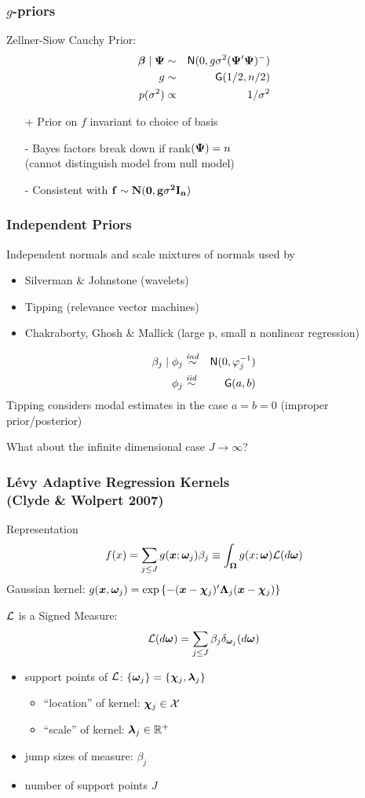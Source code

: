 \documentclass[dvips]{beamer}
\newcommand{\bs}[2]{\begin{frame} \frametitle{#1} 
{#2}
\end{frame} }
\begin{document}
\bs{$g$-priors} {
Zellner-Siow Cauchy Prior:
\begin{eqnarray*}
\bm \beta \mid \bm \Psi & \sim & \textsf{N}(0, g \sigma^2 (\bm \Psi'\bm \Psi)^{-}) \\
 g & \sim & \mbox{\sf G}(1/2, n/2) \\
 p(\sigma^2) & \propto & 1/\sigma^2
\end{eqnarray*}

\begin{itemize}
\item[+] Prior on $f$ invariant to choice of basis
\item[-] Bayes factors break down if rank$(\bm \Psi) = n$ \\ (cannot
  distinguish model from null model)  
\item[-] Consistent with $\bf{f}  \sim  N(0, g \sigma^2 \bm I_n)$
\end{itemize}
}

\bs{Independent Priors} {
Independent normals and scale mixtures of normals used by
\begin{itemize}
\item Silverman \& Johnstone (wavelets)
\item Tipping (relevance vector machines)
\item Chakraborty, Ghosh \& Mallick (large p, small n nonlinear regression)
\end{itemize}
\begin{eqnarray*}
  \beta_j \mid \phi_j & \mathrel{\mathop{\sim}\limits^{\mathit{ind}}} & \textsf{N}(0,  \varphi_j^{-1}) \\
  \phi_j    & \mathrel{\mathop{\sim}\limits^{\mathit{iid}}} & \mbox{\sf G}(a, b) \\
\end{eqnarray*}
Tipping considers modal estimates in the case $a = b = 0$ (improper
prior/posterior)  

\vspace{.25in}
What about the infinite dimensional case $J \rightarrow \infty$?
}


\bs{L\'evy Adaptive Regression Kernels \\ (Clyde \& Wolpert 2007)} {
Representation
$$
f(x)   =   \sum_{j\le J}g(\bm x; \bm \omega_j) \beta_j \equiv \int_{\bm \Omega}  
g(x;\bm \omega) {\cal L}(d\bm \omega) 
$$
Gaussian kernel: $g(\bm x,\bm \omega_j)  =  \exp\left\{-(\bm x-\bm \chi_j)'\bm \Lambda_j (\bm x - \bm \chi_j)
\right\}$ 


${\cal L}$ is a Signed Measure:
$${\cal L}(d\bm \omega)  = \sum_{j\le J} \beta_j \delta_{\bm \omega_j}(d\bm \omega) $$

  \begin{itemize}
 
  \item  support points of ${\cal L}$: $\{\bm \omega_j\} = \{\bm \chi_j,\bm \lambda_j\}$ 
    \begin{itemize}
    \item``location'' of kernel:  $\bm \chi_j\in\mathcal{X}$  
    \item ``scale'' of kernel:  $\bm \lambda_j\in\mathbb{R}^+$  
    \end{itemize} 
  \item jump sizes of measure:  $\beta_j$   
  \item number of support points  $J$ 
  \end{itemize}
} 
\end{document}
